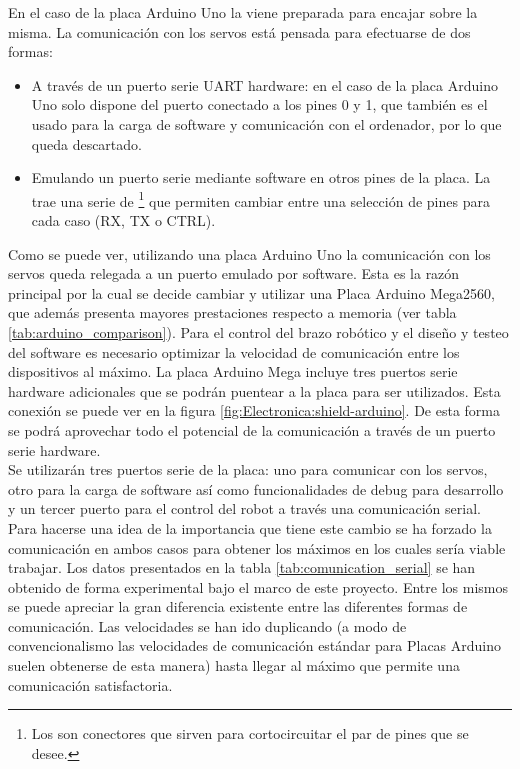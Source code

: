 	En el caso de la placa Arduino Uno la  viene preparada para encajar sobre la misma. La comunicación con los servos está pensada para efectuarse de dos formas:
	\begin{itemize}
		\item A través de un puerto serie UART hardware: en el caso de la placa Arduino Uno solo dispone del puerto conectado a los pines 0 y 1, que también es el usado para la carga de software y comunicación con el ordenador, por lo que queda descartado.
		\item Emulando un puerto serie mediante software en otros pines de la placa. La  trae una serie de  \footnote{Los  son conectores que sirven para cortocircuitar el par de pines que se desee.} que permiten cambiar entre una selección de pines para cada caso (RX, TX o CTRL).
	\end{itemize}

	Como se puede ver, utilizando una placa Arduino Uno la comunicación con los servos queda relegada a un puerto emulado por software. Esta es la razón principal por la cual se decide cambiar y utilizar una Placa Arduino Mega2560, que además presenta mayores prestaciones respecto a memoria (ver tabla \ref{tab:arduino_comparison}). Para el control del brazo robótico y el diseño y testeo del software es necesario optimizar la velocidad de comunicación entre los dispositivos al máximo. La placa Arduino Mega incluye tres puertos serie hardware adicionales que se podrán puentear a la placa  para ser utilizados. Esta conexión se puede ver en la figura \ref{fig:Electronica:shield-arduino}. De esta forma se podrá aprovechar todo el potencial de la comunicación a través de un puerto serie hardware.
	\\
	
	Se utilizarán tres puertos serie de la placa: uno para comunicar con los servos, otro para la carga de software así como funcionalidades de debug para desarrollo y un tercer puerto para el control del robot a través una comunicación serial.
	\\

	Para hacerse una idea de la importancia que tiene este cambio se ha forzado la comunicación en ambos casos para obtener los máximos en los cuales sería viable trabajar. Los datos presentados en la tabla \ref{tab:comunication_serial} se han obtenido de forma experimental bajo el marco de este proyecto. Entre los mismos se puede apreciar la gran diferencia existente entre las diferentes formas de comunicación. Las velocidades se han ido duplicando (a modo de convencionalismo las velocidades de comunicación estándar para Placas Arduino suelen obtenerse de esta manera) hasta llegar al máximo que permite una comunicación satisfactoria.

